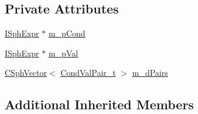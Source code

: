 \subsection*{Private Attributes}
\begin{DoxyCompactItemize}
\item 
\hyperlink{structISphExpr}{I\-Sph\-Expr} $\ast$ \hyperlink{classExpr__Remap__c_ad08931788e070932ce7600eed91706e6}{m\-\_\-p\-Cond}
\item 
\hyperlink{structISphExpr}{I\-Sph\-Expr} $\ast$ \hyperlink{classExpr__Remap__c_acde4455202ad7f76ddda559a96ec2ca5}{m\-\_\-p\-Val}
\item 
\hyperlink{classCSphVector}{C\-Sph\-Vector}$<$ \hyperlink{structExpr__Remap__c_1_1CondValPair__t}{Cond\-Val\-Pair\-\_\-t} $>$ \hyperlink{classExpr__Remap__c_ae06589f380477db2bb1ce61514bf36fd}{m\-\_\-d\-Pairs}
\end{DoxyCompactItemize}
\subsection*{Additional Inherited Members}


